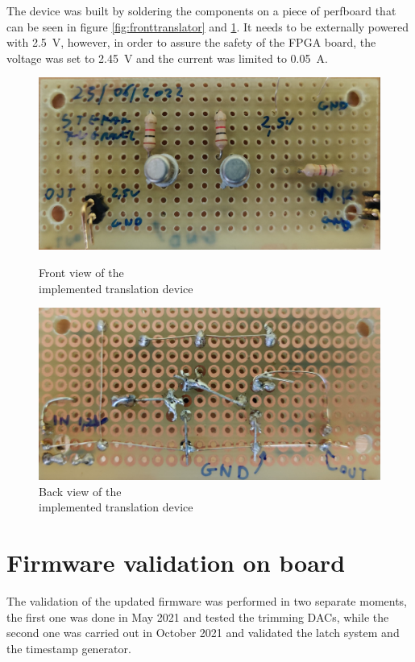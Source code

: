 \noindent The device was built by soldering the components on a piece of perfboard that can be seen in figure \ref{fig:fronttranslator} and \ref{fig:backtranslator}.
It needs to be externally powered with 2.5~V, however, in order to assure the safety of the FPGA board, the voltage was set to 2.45~V and the current was limited to 0.05~A. 
\begin{figure}[H]
	\centering
	\begin{minipage}{.5\textwidth}
		\centering
		\includegraphics[width=.99\linewidth]{IMG/ch5/FRONTTRANSLATOR}
		\caption{Front view of the \\implemented translation device}
		\label{fig:fronttranslator}
	\end{minipage}%
	\begin{minipage}{.5\textwidth}
		\centering
		\includegraphics[width=.99\linewidth]{IMG/ch5/BACKTRANSLATOR}
		\caption{Back view of the \\implemented translation device}
		\label{fig:backtranslator}
	\end{minipage}
\end{figure}

\section{Firmware validation on board}
The validation of the updated firmware was performed in two separate moments, the first one was done in May 2021 and tested the trimming DACs, while the second one was carried out in October 2021 and validated the latch system and the timestamp generator. 
